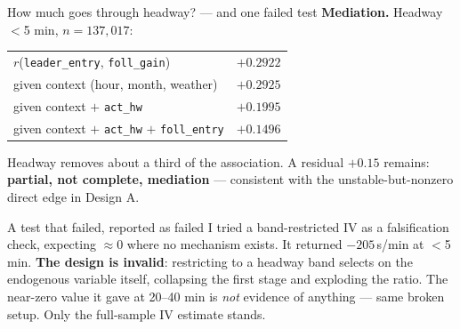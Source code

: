 \documentclass[aspectratio=169,10pt]{beamer}
\newcommand{\hl}[1]{{\color{corange}\textbf{#1}}}
\begin{document}
\begin{frame}{How much goes through headway? --- and one failed test}
  \textbf{Mediation.} Headway $<$5 min, $n = 137{,}017$:

  \vspace{0.3em}
  \centering
  \begin{tabular}{@{}lr@{}}
    \toprule
    $r$(\texttt{leader\_entry}, \texttt{foll\_gain}) & $+0.2922$ \\
    \quad given context (hour, month, weather) & $+0.2925$ \\
    \quad given context $+$ \texttt{act\_hw} & $+0.1995$ \\
    \quad given context $+$ \texttt{act\_hw} $+$ \texttt{foll\_entry} & $+0.1496$ \\
    \bottomrule
  \end{tabular}

  \vspace{0.5em}
  \raggedright
  Headway removes about a third of the association. A residual $+0.15$ remains:
  \hl{partial, not complete, mediation} --- consistent with the unstable-but-nonzero direct
  edge in Design A.

  \vspace{0.7em}
  \begin{alertblock}{\small A test that failed, reported as failed}
    \small I tried a band-restricted IV as a falsification check, expecting $\approx0$ where
    no mechanism exists. It returned $-205$\,s/min at $<$5 min. \textbf{The design is
    invalid}: restricting to a headway band selects on the endogenous variable itself,
    collapsing the first stage and exploding the ratio. The near-zero value it gave at
    20--40 min is \emph{not} evidence of anything --- same broken setup. Only the
    full-sample IV estimate stands.
  \end{alertblock}
\end{frame}
\end{document}
